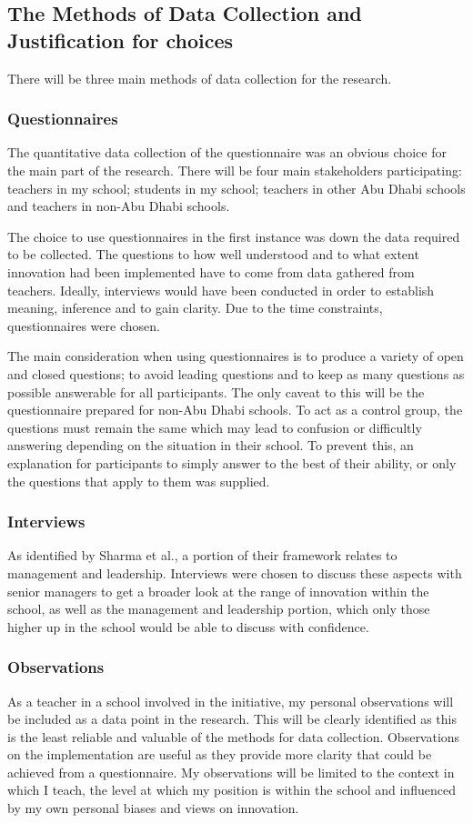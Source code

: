 \subsection{The Methods of Data Collection and Justification for choices}
There will be three main methods of data collection for the research.

\subsubsection{Questionnaires}
The quantitative data collection of the questionnaire was an obvious choice for the main part of the research. There will be four main stakeholders participating: teachers in my school; students in my school; teachers in other Abu Dhabi schools and teachers in non-Abu Dhabi schools. 

The choice to use questionnaires in the first instance was down the data required to be collected. The questions to how well understood and to what extent innovation had been implemented have to come from data gathered from teachers. Ideally, interviews would have been conducted in order to establish meaning, inference and to gain clarity. Due to the time constraints, questionnaires were chosen. 

The main consideration when using questionnaires is to produce a variety of open and closed questions; to avoid leading questions and to keep as many questions as possible answerable for all participants. The only caveat to this will be the questionnaire prepared for non-Abu Dhabi schools. To act as a control group, the questions must remain the same which may lead to confusion or difficultly answering depending on the situation in their school. To prevent this, an explanation for participants to simply answer to the best of their ability, or only the questions that apply to them was supplied.

\subsubsection{Interviews}

As identified by Sharma et al., a portion of their framework relates to management and leadership. Interviews were chosen to discuss these aspects with senior managers to get a broader look at the range of innovation within the school, as well as the management and leadership portion, which only those higher up in the school would be able to discuss with confidence.

\subsubsection{Observations}

As a teacher in a school involved in the initiative, my personal observations will be included as a data point in the research. This will be clearly identified as this is the least reliable and valuable of the methods for data collection. Observations on the implementation are useful as they provide more clarity that could be achieved from a questionnaire. My observations will be limited to the context in which I teach, the level at which my position is within the school and influenced by my own personal biases and views on innovation. 